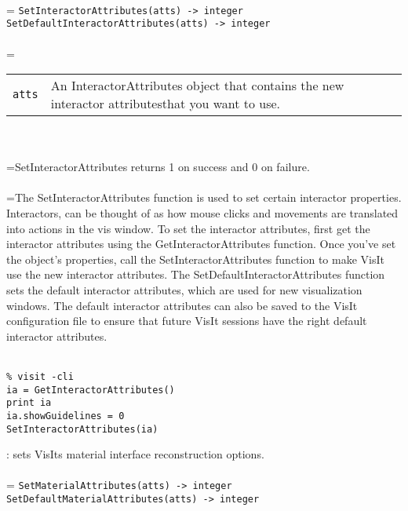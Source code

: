 \documentclass[10pt,a4paper]{report}
\begin{document}
 \\ 
\hangindent=\parindent 
\verb!SetInteractorAttributes(atts) -> integer!\\ 
\verb!SetDefaultInteractorAttributes(atts) -> integer!\\ [-3mm]

 \\ 
\hangindent=\parindent 
\begin{tabular}{lp{9cm}}
\verb!atts! & An InteractorAttributes object that contains the new interactor attributesthat you want to use. \\
\end{tabular} \\[-2mm]


 \\ 
\hangindent=\parindent SetInteractorAttributes returns 1 on success and 0 on failure. \\[-3mm] 

 \\ 
\hangindent=\parindent The SetInteractorAttributes function is used to set certain interactor properties. Interactors, can be thought of as how mouse clicks and movements are translated into actions in the vis window. To set the interactor attributes, first get the interactor attributes using the GetInteractorAttributes function. Once you've set the object's properties, call the SetInteractorAttributes function to make VisIt use the new interactor attributes. The SetDefaultInteractorAttributes function sets the default interactor attributes, which are used for new visualization windows. The default interactor attributes can also be saved to the VisIt configuration file to ensure that future VisIt sessions have the right default interactor attributes. \\[-3mm] 

\\[-6mm]
\begin{verbatim}% visit -cli
ia = GetInteractorAttributes()
print ia
ia.showGuidelines = 0
SetInteractorAttributes(ia)
\end{verbatim}
\newpage


{}
: sets VisIts material interface reconstruction options.\\[-3mm]

 \\ 
\hangindent=\parindent 
\verb!SetMaterialAttributes(atts) -> integer!\\ 
\verb!SetDefaultMaterialAttributes(atts) -> integer!\\ [-3mm]
\end{document}
